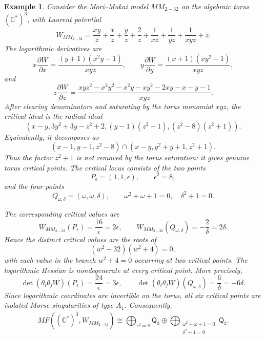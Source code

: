 \documentclass[11pt]{amsart}
\newtheorem{example}{Example}[section]
\newcommand{\MorseCat}[1]{\mathsf{Q}_{#1}}
\begin{document}
\begin{example}
Consider the Mori--Mukai model $MM_{2-32}$ on the algebraic torus
$(\mathbb{C}^*)^3$, with Laurent potential
\[
W_{MM_{2-32}}=\frac{xy}{z}+\frac{x}{z}+\frac{y}{z}+\frac{2}{z}
+\frac{1}{xz}+\frac{1}{yz}+\frac{1}{xyz}+z.
\]
The logarithmic derivatives are
\[
x\frac{\partial W}{\partial x}
=\frac{(y+1)(x^2y-1)}{xyz},
\qquad
y\frac{\partial W}{\partial y}
=\frac{(x+1)(xy^2-1)}{xyz},
\]
and
\[
z\frac{\partial W}{\partial z}
=\frac{xy z^2-x^2y^2-x^2y-xy^2-2xy-x-y-1}{xyz}.
\]
After clearing denominators and saturating by the torus monomial $xyz$, the
critical ideal is the radical ideal
\[
\left(
x-y,
3y^2+3y-z^2+2,
(y-1)(z^2+1),
(z^2-8)(z^2+1)
\right).
\]
Equivalently, it decomposes as
\[
(x-1,y-1,z^2-8)
\cap
(x-y,y^2+y+1,z^2+1).
\]
Thus the factor $z^2+1$ is not removed by the torus saturation: it gives
genuine torus critical points. The critical locus consists of the two points
\[
P_{\epsilon}=(1,1,\epsilon),
\qquad \epsilon^2=8,
\]
and the four points
\[
Q_{\omega,\delta}=(\omega,\omega,\delta),
\qquad \omega^2+\omega+1=0,\quad \delta^2+1=0.
\]

The corresponding critical values are
\[
W_{MM_{2-32}}(P_{\epsilon})=\frac{16}{\epsilon}=2\epsilon,
\qquad
W_{MM_{2-32}}(Q_{\omega,\delta})=-\frac{2}{\delta}=2\delta.
\]
Hence the distinct critical values are the roots of
\[
(w^2-32)(w^2+4)=0,
\]
with each value in the branch $w^2+4=0$ occurring at two critical points. The
logarithmic Hessian is nondegenerate at every critical point. More precisely,
\[
\det(\theta_i\theta_jW)(P_{\epsilon})=\frac{24}{\epsilon}=3\epsilon,
\qquad
\det(\theta_i\theta_jW)(Q_{\omega,\delta})=\frac{6}{\delta}=-6\delta.
\]
Since logarithmic coordinates are invertible on the torus, all six critical
points are isolated Morse singularities of type $A_1$. Consequently,
\[
\overline{MF((\mathbb{C}^*)^3,W_{MM_{2-32}})}
\cong \bigoplus_{\epsilon^2=8}\MorseCat{3} \oplus \bigoplus_{\substack{\omega^2+\omega+1=0\\ \delta^2+1=0}}\MorseCat{3}.
\]
\end{example}
\end{document}
